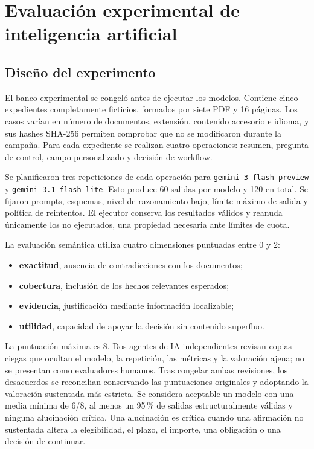 \section{Evaluación experimental de inteligencia artificial}
\label{sec:ai-evaluation}

\subsection{Diseño del experimento}

El banco experimental se congeló antes de ejecutar los modelos. Contiene cinco
expedientes completamente ficticios, formados por siete PDF y 16 páginas. Los
casos varían en número de documentos, extensión, contenido accesorio e idioma,
y sus hashes SHA-256 permiten comprobar que no se modificaron durante la
campaña. Para cada expediente se realizan cuatro operaciones: resumen,
pregunta de control, campo personalizado y decisión de workflow.

Se planificaron tres repeticiones de cada operación para
\texttt{gemini-3-flash-preview} y \texttt{gemini-3.1-flash-lite}. Esto produce
60 salidas por modelo y 120 en total. Se fijaron prompts, esquemas, nivel de
razonamiento bajo, límite máximo de salida y política de reintentos. El
ejecutor conserva los resultados válidos y reanuda únicamente los no ejecutados,
una propiedad necesaria ante límites de cuota.

La evaluación semántica utiliza cuatro dimensiones puntuadas entre 0 y 2:

\begin{itemize}
  \item \textbf{exactitud}, ausencia de contradicciones con los documentos;
  \item \textbf{cobertura}, inclusión de los hechos relevantes esperados;
  \item \textbf{evidencia}, justificación mediante información localizable;
  \item \textbf{utilidad}, capacidad de apoyar la decisión sin contenido
  superfluo.
\end{itemize}

La puntuación máxima es 8. Dos agentes de IA independientes revisan copias
ciegas que ocultan el modelo, la repetición, las métricas y la valoración
ajena; no se presentan como evaluadores humanos. Tras congelar ambas
revisiones, los desacuerdos se reconcilian conservando las puntuaciones
originales y adoptando la valoración sustentada más estricta. Se considera
aceptable un modelo con una media mínima de 6/8, al menos un 95\,\% de salidas
estructuralmente válidas y ninguna alucinación crítica. Una alucinación es
crítica cuando una afirmación no sustentada altera la elegibilidad, el plazo,
el importe, una obligación o una decisión de continuar.

